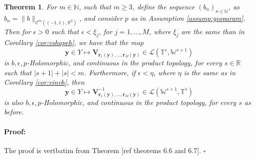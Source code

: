 \documentclass{article}
\newtheorem{theorem}{Theorem}[section]
\newenvironment{proof}{\paragraph{Proof:}}{\hfill$\square$}
\newcommand{\todo}[1]{{\color{red}[#1]}}
\newcommand{\IN}{{\mathbb N}}
\newcommand{\IR}{{\mathbb R}}
\newcommand{\cmspace}[3]{\mathcal{C}^{#1} \left( #2, #3 \right)}
\newcommand{\br}{\bm{r}}
\newcommand{\by}{\bm{y}}
\begin{document}
\begin{theorem}
\label{thrm:parametricholomr}
For $m \in \IN$, such that $m \geq 3$, define the sequence $(b_n)_{n\in \IN}$, as $b_n = \| b\|_{\cmspace{m}{(-1,1)}{\IR^2}}$, and consider $p$ as in Assumption \ref{assump:geoparam}. Then for $\epsilon >0$ such that $ \epsilon < \xi_j$, for $j=1,\hdots,M$, where $\xi_j$ are the same than in Corollary \ref{cor:vshapeh}, we have that the map 
$$
\by \in Y \mapsto \mathbf{V}_{\br_1(\by),\hdots,\br_M(\by)} \in \mathcal{L}(\mathbb{T}^s,\mathbb{W}^{s+1})
$$
is $b,\epsilon,p$-Holomorphic, and continuous in the product topology, for every $s\in \IR$ such that $|s+1|+|s| < m$. Furthermore, if $\epsilon< \eta$, where $\eta$ is the same as in Corollary \ref{cor:vinvh}, then 
$$
\by \in Y \mapsto \mathbf{V}_{\br_1(\by),\hdots,\br_M(\by)}^{-1} \in \mathcal{L}(\mathbb{W}^{s+1},\mathbb{T}^s)
$$
is also $b,\epsilon,p$-Holomorphic, and continuous in the product topology, for every $s$ as before.
\end{theorem}
\begin{proof}
The proof is vertbatim from Theorem \todo{ref theorems 6.6 and 6.7}.
\end{proof}
\end{document}
